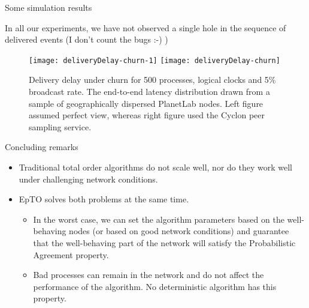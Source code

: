 
\begin{frame}{Some simulation results}
  
  \begin{snugshade}
In all our experiments, we have not observed a single hole in the sequence of delivered events (I don't count the bugs :-) )
 \end{snugshade}

\begin{figure}[!t]
 \texttt{[image: deliveryDelay-churn-1]} 
  \texttt{[image: deliveryDelay-churn]}
\caption{Delivery delay under churn for 500 processes, logical clocks and 5\% broadcast rate. The end-to-end latency distribution drawn from a sample of geographically dispersed PlanetLab nodes. Left figure assumed perfect view, whereas right figure used the Cyclon peer sampling service.}
\label{fig:churn_cyclon}
\end{figure}


\end{frame}


\subtitle[Conclusion]{Conclusion}


\begin{frame}{Concluding remarks}

  \begin{itemize}

\item Traditional total order algorithms do not scale well, nor do they work well under challenging network conditions. 

\item EpTO solves both problems at the same time.

\bigskip

\begin{snugshade}

  \begin{itemize}

  \item In the worst case, we can set the algorithm parameters based on the well-behaving nodes (or based on good network conditions) and guarantee that the well-behaving part of the network will satisfy the Probabilistic Agreement property. 

\medskip

\item Bad processes can remain in the network and do not affect the performance of the algorithm. No deterministic algorithm has this property.

  \end{itemize}

\end{snugshade}


  \end{itemize}
  
\end{frame}

